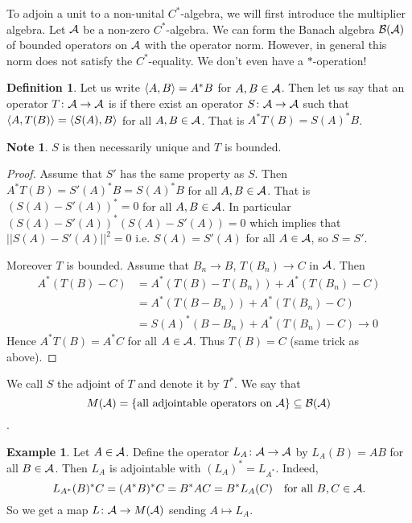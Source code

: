 \documentclass[10pt,english,a4paper]{article}
\theoremstyle{definition}
\newtheorem*{definition}{Definition}
\newtheorem*{example}{Example}
\newtheorem*{note}{Note}
\let\emph\relax %
\begin{document}
To adjoin a unit to a non-unital $C^*$-algebra, we will first introduce the multiplier 
algebra. Let $\mathcal{A}$ be a non-zero $C^*$-algebra. We can form the Banach algebra 
$\mathcal{B}(\mathcal{A})$ of bounded operators on $\mathcal{A}$ with the operator norm. However, in 
general this norm does not satisfy the $C^*$-equality. We don't even have a 
$*$-operation! 

\begin{definition}
    
Let us write $\left\langle A,B \right\rangle = A^*B$ for $A,B \in \mathcal{A}$. Then let us
say that an operator 
$ T \colon \mathcal{A} \to \mathcal{A}$ is \emph{adjointable}
if there exist an operator $S\colon \mathcal{A} \to \mathcal{A}$ such that $\left\langle A,T(B) \right\rangle= \left\langle S(A), B \right\rangle$
for all $A,B \in \mathcal{A}$. That is $A^*T(B) = S(A)^*B$.
\end{definition}


\begin{note}
    $S$ is then necessarily unique and $T$ is bounded.
\end{note}
\begin{proof}
    Assume that $S'$ has the same property as $S$. Then $A^* T(B) = S'(A)^*B = S(A)^*B$
for all $A,B \in \mathcal{A}$. That is $(S(A)-S'(A))^*= 0$ for all $A,B \in \mathcal{A}$. In particular 
$(S(A) -S'(A))^*(S(A)-S'(A)) =0$ which implies that $||S(A)-S'(A)||^2 = 0$ i.e.
$S(A)=S'(A)$ for all $A \in \mathcal{A}$, so $S = S'$.

Moreover $T$ is bounded. 
Assume that $B_n \to B$, $T(B_n) \to C$ in $\mathcal{A}$. Then 
\begin{align*}
A^*(T(B)-C) &=
A^* (T(B)-T(B_n)) + A^*(T(B_n)-C) \\
&= A^*(T(B-B_n)) + A^*(T(B_n)-C) \\ &= S(A)^*(B-B_n) + A^*(T(B_n)-C) \to 0
\end{align*}
Hence $A^*T(B) = A^*C $ for all $A \in \mathcal{A}$. Thus $T(B) = C$ (same trick as above).
\end{proof}

We call $S$ the adjoint of $T$ and denote it by $T^*$. We say that 
\[M(\mathcal{A}) = \{\text{all adjointable operators on }\mathcal{A}\} \subseteq \mathcal{B}(\mathcal{A})\].

\begin{example}
    Let $A \in \mathcal{A}$. Define the operator $L_A \colon \mathcal{A}\to\mathcal{A}$ by $L_A(B) = AB$
for all $B \in \mathcal{A}$. Then $L_A$ is adjointable with $(L_{A})^* = L_{A^*}$. 
Indeed, 
\[L_{A^*}(B)^*C  = (A^*B)^*C = B^*AC = B^*L_{A}(C)\quad \text{for all } B, C \in \mathcal{A}.\]
So we get a map $L\colon \mathcal{A} \to M(\mathcal{A})$ sending $A \mapsto L_{A}$. 
\end{example}
\end{document}
